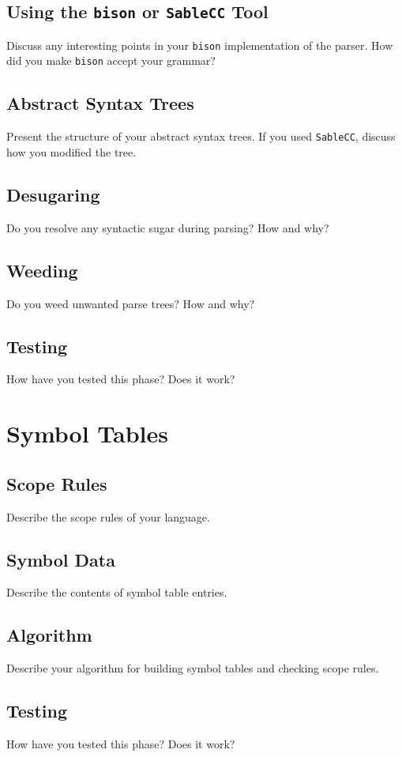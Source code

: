 \documentclass{WigReport}
\begin{document}
\subsection{Using the {\tt bison} or {\tt SableCC} Tool}
Discuss any interesting points in your {\tt bison} implementation of the
parser. How did you make {\tt bison} accept your grammar? 

\subsection{Abstract Syntax Trees}
Present the structure of your abstract syntax trees.  If you used 
{\tt SableCC}, discuss how you modified the tree.

\subsection{Desugaring}
Do you resolve any syntactic sugar during parsing? How and why?

\subsection{Weeding}
Do you weed unwanted parse trees? How and why?

\subsection{Testing}
How have you tested this phase? Does it work?

\section{Symbol Tables}
\subsection{Scope Rules}
Describe the scope rules of your language.

\subsection{Symbol Data}
Describe the contents of symbol table entries.

\subsection{Algorithm}
Describe your algorithm for building symbol tables and
checking scope rules.

\subsection{Testing}
How have you tested this phase? Does it work?
\end{document}
